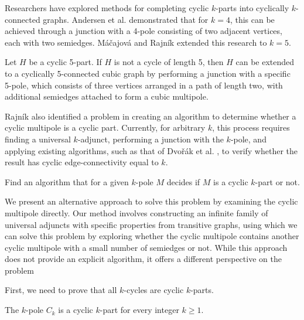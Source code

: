 \documentclass[12pt, twoside]{book}
\begin{document}
Researchers have explored methods for completing cyclic $k$-parts into cyclically $k$-connected graphs. Andersen et al. \cite{Andersen1988} demonstrated that for $k=4$, this can be achieved through a junction with a 4-pole consisting of two adjacent vertices, each with two semiedges. Máčajová and Rajník \cite{Macajova2022} extended this research to $k=5$.

\begin{theorem}
	Let $H$ be a cyclic 5-part. If $H$ is not a cycle of length 5, then $H$ can be extended to a cyclically 5-connected cubic graph by performing a junction with a specific 5-pole, which consists of three vertices arranged in a path of length two, with additional semiedges attached to form a cubic multipole.
\end{theorem}

Rajník \cite{Rajnik_phd} also identified a problem in creating an algorithm to determine whether a cyclic multipole is a cyclic part. Currently, for arbitrary $k$, this process requires finding a universal $k$-adjunct, performing a junction with the $k$-pole, and applying existing algorithms, such as that of Dvořák et al. \cite{Dvorak2004}, to verify whether the result has cyclic edge-connectivity equal to $k$.

\begin{problem}\label{problem:cyclic-part-algorithm}
	Find an algorithm that for a given $k$-pole $M$ decides if $M$ is a cyclic $k$-part or not.
\end{problem}

We present an alternative approach to solve this problem by examining the cyclic multipole directly. Our method involves constructing an infinite family of universal adjuncts with specific properties from transitive graphs, using which we can solve this problem by exploring whether the cyclic multipole contains another cyclic multipole with a small number of semiedges or not. While this approach does not provide an explicit algorithm, it offers a different perspective on the problem

First, we need to prove that all $k$-cycles are cyclic $k$-parts.

\begin{lemma}\label{lem:each-cycle-cyclic-part}
	The $k$-pole $C_k$ is a cyclic $k$-part for every integer $k\geq 1$.
\end{lemma}
\end{document}
